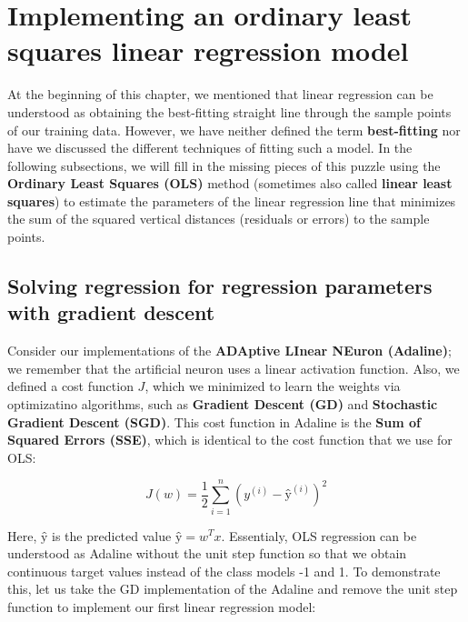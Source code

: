 \documentclass[11pt]{article}
\begin{document}
    \section{Implementing an ordinary least squares linear regression
model}\label{implementing-an-ordinary-least-squares-linear-regression-model}

    At the beginning of this chapter, we mentioned that linear regression
can be understood as obtaining the best-fitting straight line through
the sample points of our training data. However, we have neither defined
the term \textbf{best-fitting} nor have we discussed the different
techniques of fitting such a model. In the following subsections, we
will fill in the missing pieces of this puzzle using the
\textbf{Ordinary Least Squares (OLS)} method (sometimes also called
\textbf{linear least squares}) to estimate the parameters of the linear
regression line that minimizes the sum of the squared vertical distances
(residuals or errors) to the sample points.

    \subsection{Solving regression for regression parameters with gradient
descent}\label{solving-regression-for-regression-parameters-with-gradient-descent}

    Consider our implementations of the \textbf{ADAptive LInear NEuron
(Adaline)}; we remember that the artificial neuron uses a linear
activation function. Also, we defined a cost function \(J\), which we
minimized to learn the weights via optimizatino algorithms, such as
\textbf{Gradient Descent (GD)} and \textbf{Stochastic Gradient Descent
(SGD)}. This cost function in Adaline is the \textbf{Sum of Squared
Errors (SSE)}, which is identical to the cost function that we use for
OLS:

\[J(w) = \frac{1}{2}\sum_{i=1}^n(y^{(i)} - ŷ^{(i)})^2\]

Here, \(ŷ\) is the predicted value \(ŷ = w^Tx\). Essentialy, OLS
regression can be understood as Adaline without the unit step function
so that we obtain continuous target values instead of the class models
-1 and 1. To demonstrate this, let us take the GD implementation of the
Adaline and remove the unit step function to implement our first linear
regression model:
\end{document}
